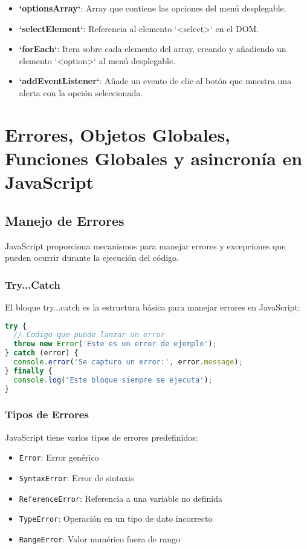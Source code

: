 \documentclass{book}
\begin{document}
\begin{itemize}
    \item \textbf{`optionsArray`}: Array que contiene las opciones del menú desplegable.
    \item \textbf{`selectElement`}: Referencia al elemento `<select>` en el DOM.
    \item \textbf{`forEach`}: Itera sobre cada elemento del array, creando y añadiendo un elemento `<option>` al menú desplegable.
    \item \textbf{`addEventListener`}: Añade un evento de clic al botón que muestra una alerta con la opción seleccionada.
\end{itemize}

\chapter{Errores, Objetos Globales, Funciones Globales y asincronía en JavaScript}

\section{Manejo de Errores}

JavaScript proporciona mecanismos para manejar errores y excepciones que pueden ocurrir durante la ejecución del código.

\subsection{Try...Catch}

El bloque try...catch es la estructura básica para manejar errores en JavaScript:

\begin{lstlisting}[language=JavaScript]
try {
  // Codigo que puede lanzar un error
  throw new Error('Este es un error de ejemplo');
} catch (error) {
  console.error('Se capturo un error:', error.message);
} finally {
  console.log('Este bloque siempre se ejecuta');
}
\end{lstlisting}

\subsection{Tipos de Errores}

JavaScript tiene varios tipos de errores predefinidos:

\begin{itemize}
  \item \texttt{Error}: Error genérico
  \item \texttt{SyntaxError}: Error de sintaxis
  \item \texttt{ReferenceError}: Referencia a una variable no definida
  \item \texttt{TypeError}: Operación en un tipo de dato incorrecto
  \item \texttt{RangeError}: Valor numérico fuera de rango
\end{itemize}
\end{document}
